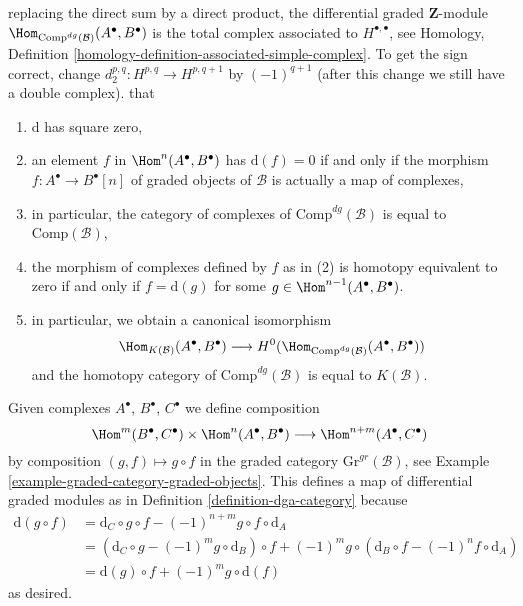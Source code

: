 \begin{example}
{replacing the direct sum by a direct product, the differential graded
$\mathbf{Z}$-module
$\Hom_{\text{Comp}^{dg}(\mathcal{B})}(A^\bullet, B^\bullet)$
is the total complex associated to $H^{\bullet, \bullet}$, see
Homology, Definition \ref{homology-definition-associated-simple-complex}.
To get the sign correct, change $d_2^{p, q} : H^{p, q} \to H^{p, q + 1}$ by
$(-1)^{q + 1}$ (after this change we still have a double complex).} that
\begin{enumerate}
\item $\text{d}$ has square zero,
\item an element $f$ in $\Hom^n(A^\bullet, B^\bullet)$
has $\text{d}(f) = 0$ if and only if the morphism
$f : A^\bullet \to B^\bullet[n]$ of graded objects of $\mathcal{B}$
is actually a map of complexes,
\item in particular, the category of complexes of
$\text{Comp}^{dg}(\mathcal{B})$ is equal to $\text{Comp}(\mathcal{B})$,
\item the morphism of complexes defined by $f$ as in (2)
is homotopy equivalent to zero if and only if $f = \text{d}(g)$
for some $g \in \Hom^{n - 1}(A^\bullet, B^\bullet)$.
\item in particular, we obtain a canonical isomorphism
$$
\Hom_{K(\mathcal{B})}(A^\bullet, B^\bullet)
\longrightarrow
H^0(\Hom_{\text{Comp}^{dg}(\mathcal{B})}(A^\bullet, B^\bullet))
$$
and the homotopy category of $\text{Comp}^{dg}(\mathcal{B})$ is equal to
$K(\mathcal{B})$.
\end{enumerate}
Given complexes $A^\bullet$, $B^\bullet$, $C^\bullet$ we define
composition
$$
\Hom^m(B^\bullet, C^\bullet) \times \Hom^n(A^\bullet, B^\bullet)
\longrightarrow
\Hom^{n + m}(A^\bullet, C^\bullet)
$$
by composition $(g, f) \mapsto g \circ f$ in the graded category
$\text{Gr}^{gr}(\mathcal{B})$, see
Example \ref{example-graded-category-graded-objects}.
This defines a map of differential graded modules as in
Definition \ref{definition-dga-category}
because
\begin{align*}
\text{d}(g \circ f) & =
\text{d}_C \circ g \circ f - (-1)^{n + m} g \circ f \circ \text{d}_A \\
& =
\left(\text{d}_C \circ g - (-1)^m g \circ \text{d}_B\right) \circ f +
(-1)^m g \circ \left(\text{d}_B \circ f - (-1)^n f \circ \text{d}_A\right) \\
& =
\text{d}(g) \circ f + (-1)^m g \circ \text{d}(f)
\end{align*}
as desired.
\end{example}

